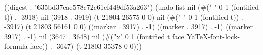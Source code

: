 
((digest . "635bd37eae578c72e61ef449df53a263") (undo-list nil (#("
" 0 1 (fontified t)) . -3918) nil (3918 . 3919) (t 21804 26575 0 0) nil (#("
" 0 1 (fontified t)) . -3917) (t 21803 56161 0 0) ((marker . 3917) . -1) ((marker . 3917) . -1) ((marker . 3917) . -1) nil (3647 . 3648) nil (#("x" 0 1 (fontified t face YaTeX-font-lock-formula-face)) . -3647) (t 21803 35378 0 0)))
